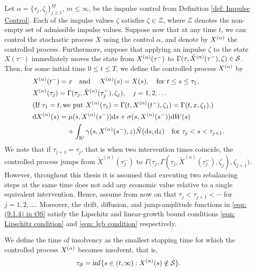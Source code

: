 Let $\alpha=\{\tau_j,\zeta_j\}_{j \geq 1}^M$, $m\leq \infty$, be the impulse control from Definition \ref{def: Impulse Control}. Each of the impulse values $\zeta$ satisfies $\zeta \in \mathcal Z$, where $\mathcal Z$ denotes the non-empty set of admissible impulse values. Suppose now that at any time $t$, we can control the stochastic process $X$ using the control $\alpha$, and denote by $X^{(\alpha)}$ the controlled process.  Furthermore, suppose that applying an impulse $\zeta$ to the state $X(\tau^-)$ immediately moves the state from $X^{(\alpha)}(\tau^-)$ to $\Gamma(\tau,\check{X}^{(\alpha)}(\tau^-),\zeta) \in \mathcal{S}$. Then, for some initial time $0 \leq t \leq T$, we define the controlled process $X^{(\alpha)}$ by
\begin{align}
    & X^{(\alpha)} (t^-) = x \quad \text{and } \quad X^{(\alpha)}(s) = X(s), \quad \text{for } t \leq s \leq \tau_1, \label{eqn: (9.1.2) in ØS} \\
    & X^{(\alpha)} (\tau_j) = \Gamma(\tau_j, \check{X}^{(\alpha)}(\tau_j^-), \zeta_j), \quad j=1,2, \ldots \label{eqn: (9.1.3) in ØS} \\
    & (\text{If } \tau_1=t, \text{we put } X^{(\alpha)}(\tau_1) = \Gamma(t,X^{(\alpha)}(t^-), \zeta_1) = \Gamma(t,x,\zeta_1).) \nonumber \\
    & \mathrm{d} X^{(\alpha)}(s) = \mu(s,X^{(\alpha)}(s^-)) \mathrm{d} s + \sigma(s,X^{(\alpha)}(s^-)) \mathrm{d} W(s) \nonumber \\
    & \qquad \qquad \quad + \int_{\mathbb{R}^l} \gamma(s,X^{(\alpha)}(s^-),z) \tilde N(\mathrm{d} s, \mathrm{d} z) \quad \text{for } \tau_j < s < \tau_{j+1}. \label{eqn: (9.1.4) in ØS}
\end{align}
We note that if $\tau_{j+1} = \tau_j$, that is when two intervention times coincide, the controlled process jumps from $\check{X}^{(\alpha)}(\tau_j^-)$ to $\Gamma \big(\tau_j,\Gamma(\tau_j,\check{X}^{(\alpha)}(\tau_j^-),\zeta_j),\zeta_{j+1}\big)$. However, throughout this thesis it is assumed that executing two rebalancing steps at the same time does not add any economic value relative to a single equivalent intervention. Hence, assume from now on that $\tau_j < \tau_{j+1} < \cdots$ for $j=1,2, \ldots$. Moreover, the drift, diffusion, and jump-amplitude functions in \eqref{eqn: (9.1.4) in ØS} satisfy the Lipschitz and linear-growth bound conditions \eqref{eqn: Lipschitz condition} and \eqref{eqn: lgb condition} respectively.

\begin{definition}
\label{def: Time of Insolvency}
    We define the time of insolvency as the smallest stopping time for which the controlled process $X^{(\alpha)}$ becomes insolvent, that is,
    \begin{equation*}
        \tau_\mathcal{S} = \inf \{s \in (t,\infty): X^{(\alpha)}(s) \notin \mathcal{S}\}.
    \end{equation*}
\end{definition}


